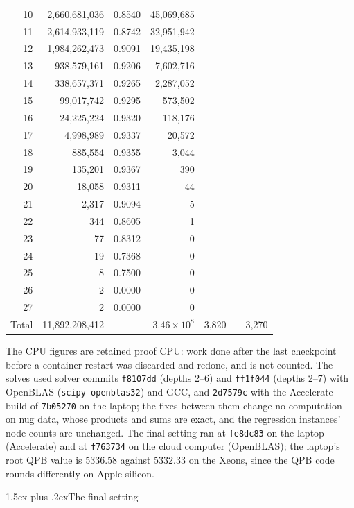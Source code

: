 \documentclass[10pt]{article}
\makeatletter
\renewcommand\subsection{\@startsection{subsection}{2}{\z@}{-3.25ex plus -1ex minus -.2ex}%
  {1.5ex plus .2ex}{\normalfont\normalsize\bfseries}}
\theoremstyle{remark}
\makeatother
\begin{document}
\begin{table}[p]
\begin{tabular}{rrrrrrr}
10 & 2,660,681,036 & 0.8540 & 45,069,685 & & &\\
11 & 2,614,933,119 & 0.8742 & 32,951,942 & & &\\
12 & 1,984,262,473 & 0.9091 & 19,435,198 & & &\\
13 & 938,579,161 & 0.9206 & 7,602,716 & & &\\
14 & 338,657,371 & 0.9265 & 2,287,052 & & &\\
15 & 99,017,742 & 0.9295 & 573,502 & & &\\
16 & 24,225,224 & 0.9320 & 118,176 & & &\\
17 & 4,998,989 & 0.9337 & 20,572 & & &\\
18 & 885,554 & 0.9355 & 3,044 & & &\\
19 & 135,201 & 0.9367 & 390 & & &\\
20 & 18,058 & 0.9311 & 44 & & &\\
21 & 2,317 & 0.9094 & 5 & & &\\
22 & 344 & 0.8605 & 1 & & &\\
23 & 77 & 0.8312 & 0 & & &\\
24 & 19 & 0.7368 & 0 & & &\\
25 & 8 & 0.7500 & 0 & & &\\
26 & 2 & 0.0000 & 0 & & &\\
27 & 2 & 0.0000 & 0 & & &\\
\midrule
Total & 11,892,208,412 & & $3.46\times10^8$ & 3,820 & & 3,270\\
\bottomrule
\end{tabular}
\end{table}

The CPU figures are retained proof CPU: work done after the last checkpoint before
a container restart was discarded and redone, and is not counted. The solves used
solver commits \texttt{f8107dd} (depths 2--6) and \texttt{ff1f044} (depths 2--7)
with OpenBLAS (\texttt{scipy-openblas32}) and GCC, and \texttt{2d7579c} with the
Accelerate build of \texttt{7b05270} on the laptop; the fixes between them change no
computation on nug data, whose products and sums are exact, and the regression
instances' node counts are unchanged. The final setting ran at \texttt{fe8dc83} on
the laptop (Accelerate) and at \texttt{f763734} on the cloud computer (OpenBLAS); the
laptop's root QPB value is 5336.58 against 5332.33 on the Xeons, since the QPB code
rounds differently on Apple silicon.

\subsection{The final setting}\label{sec:record}
\end{document}
